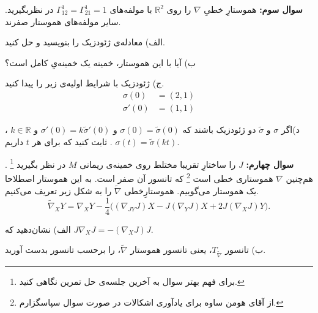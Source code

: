 \documentclass{article}
\newenvironment{parind}{%
	\par%
	\medskip
	\leftskip=0mm\rightskip=7mm
	\noindent\ignorespaces}{%
	\par\medskip}
\begin{document}
	\vspace{-1em}
	\noindent
	\textbf{سوال سوم:}
	هموستارِ خطیِ
	$\nabla$ را روی 
	$\mathbb{R}^2$
	با مولفه‌های 
	$\Gamma^1_{12} = \Gamma^1_{21}=1$
	در نظربگیرید. سایر مولفه‌های هموستار صفرند. 
	\begin{parind}
		الف) معادله‌ی ژئودزیک را بنویسید و حل کنید.
		
		ب) آیا با این هموستار، خمینه یک خمینه‌یِ کامل 
		است؟
		
		ج) ژئودزیک با شرایط اولیه‌ی زیر را پیدا کنید.
		\begin{equation*}
			\begin{aligned}
				\sigma(0) &= (2,1) \\ \sigma'(0) &= (1,1)
			\end{aligned}
		\end{equation*}
		
		د)اگر 
		$\sigma$
		و 
		$\tilde{\sigma}$
		دو ژئودزیک باشند که 
		$\sigma(0) = \tilde{\sigma}(0)$
		و 
		$\sigma'(0) = k\tilde{\sigma}'(0)$
		و
		$k\in \mathbb{R}$
		، ثابت کنید که برای هر $t$ داریم 
	.	$\sigma(t) = \tilde{\sigma}(kt)$.
		
	\end{parind}
	
	
	\vspace{-1em}
	\endline
	
	\vspace{-1em}
	\textbf{سوال چهارم:}
	$J$ را ساختارِ تقریبا مختلط
	روی خمینه‌ی ریمانی $M$ در نظر بگیرید
	\footnote{برای فهم بهتر سوال به آخرین جلسه‌ی حل تمرین نگاهی کنید.}
	. هم‌چنین $\nabla$ هموستاری خطی است 
	\footnote{از آقای هومن ساوه برای یادآوری اشکالات در صورت سوال سپاسگزارم.}
	که تانسور  آن صفر است. به این هموستار اصطلاحا یک هموستار 
	می‌گوییم.  هموستارِخطی 
	$\tilde{\nabla}$ را به شکل زیر تعریف می‌کنیم.
	\[
	\tilde{\nabla}_XY = \nabla_XY - \frac14\Big(
	(\nabla_{JY} J) X -J (\nabla_Y J)X + 2J (\nabla_XJ)Y
	\Big).
	\]
	\begin{parind}

		 الف) نشان‌دهید که 
		 $J\nabla_XJ = - (\nabla_XJ)J$.
		
		ب) تانسور 
		$T_{\tilde{\nabla}}$، یعنی تانسور 
		هموستار
		$\tilde{\nabla}$، را برحسب
		تانسور 
		بدست آورید. 
		
	\end{parind}
	
	\vspace{-1em}
	\endline
	
\end{document}
